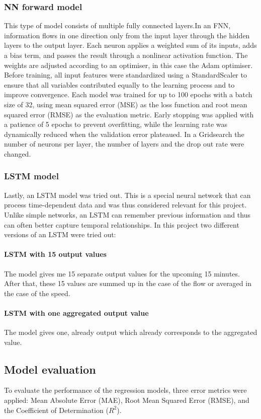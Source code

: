 	\subsubsection{NN forward model}
	This type of model consists of multiple fully connected layers.In an FNN, information flows in one direction only from the input layer through the hidden layers to the output layer. Each neuron applies a weighted sum of its inputs, adds a bias term, and passes the result through a nonlinear activation function.  The weights are adjusted according to an optimiser, in this case the Adam optimiser.
	Before training, all input features were standardized using a StandardScaler to ensure that all variables contributed equally to the learning process and to improve convergence.
	Each model was trained for up to 100 epochs with a batch size of 32, using mean squared error (MSE) as the loss function and root mean squared error (RMSE) as the evaluation metric.
	Early stopping was applied with a patience of 5 epochs to prevent overfitting, while the learning rate was dynamically reduced when the validation error plateaued.
	In a Gridsearch the number of neurons per layer, the number of layers and the drop out rate were changed.
	\subsubsection{LSTM model}
	Lastly, an LSTM model was tried out. This is a special neural network that can process time-dependent data and was thus considered relevant for this project. Unlike simple networks, an LSTM can remember previous information and thus can often better capture temporal relationships.\newline 
	In this project two different versions of an LSTM were tried out:
	\paragraph{LSTM with 15 output values}
	The model gives me 15 separate output values for the upcoming 15 minutes. After that, these 15 values are summed up in the case of the flow or averaged in the case of the speed.
	\paragraph{LSTM with one aggregated output value}
	The model gives one, already output which already corresponds to the aggregated value.
	\subsection{Model evaluation}
	To evaluate the performance of the regression models, three error metrics were applied: Mean Absolute Error (MAE), Root Mean Squared Error (RMSE), and the Coefficient of Determination ($R^2$).
